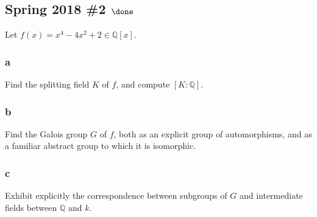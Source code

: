 \hypertarget{spring-2018-2-done}{%
\subsection{\texorpdfstring{Spring 2018 \#2
\(\done\)}{Spring 2018 \#2 \textbackslash done}}\label{spring-2018-2-done}}

Let \(f(x) = x^4 - 4x^2 + 2 \in {\mathbb{Q}}[x]\).

\hypertarget{a-59}{%
\subsubsection{a}\label{a-59}}

Find the splitting field \(K\) of \(f\), and compute
\([K: {\mathbb{Q}}]\).

\hypertarget{b-49}{%
\subsubsection{b}\label{b-49}}

Find the Galois group \(G\) of \(f\), both as an explicit group of
automorphisms, and as a familiar abstract group to which it is
isomorphic.

\hypertarget{c-33}{%
\subsubsection{c}\label{c-33}}

Exhibit explicitly the correspondence between subgroups of \(G\) and
intermediate fields between \({\mathbb{Q}}\) and \(k\).


